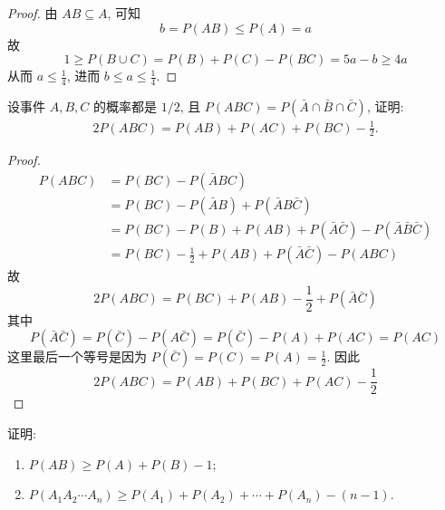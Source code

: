 \documentclass[../main.tex]{subfiles}
\begin{document}
\begin{proof}
    由 \(  AB \subseteq A  \), 可知 \[
    b= P\left( AB \right)\le P\left( A \right)= a  
    \] 故
  \[
  1\ge P\left( B\cup C \right)= P\left( B \right)+ P\left( C \right)-P\left( BC \right)= 5a-b    \ge 4a
  \]从而 \(  a\le \frac{1 }{4 }   \), 进而 \(  b\le a\le \frac{1 }{4 }   \).  
\end{proof}
\begin{exercise}{}{}
设事件 $A, B, C$ 的概率都是 $1/2$, 且 $P(ABC) = P(\bar{A}\cap\bar{B}\cap\bar{C})$, 证明:
\[\begin{aligned}
2P(ABC) = P(AB) + P(AC) + P(BC) - \frac{1}{2}.
\end{aligned}\]
\end{exercise}

\begin{proof}
     \[
     \begin{aligned}
     P\left( ABC \right)&= P\left( BC \right)-P\left( \bar{A}BC \right)\\ 
      &=     P\left( BC \right)-P\left( \bar{A}B \right)+ P\left( \bar{A}B \bar{C} \right)   \\ 
       &= P\left( BC \right)-P\left( B \right)+ P\left( AB \right)     + P\left( \bar{A}\bar{C} \right)-P\left( \bar{A}\bar{B}\bar{C} \right)  \\ 
        &= P\left( BC \right)-\frac{1 }{2 }+ P\left( AB \right)+ P\left( \bar{A}\bar{C} \right) -P\left( ABC \right)     
     \end{aligned}
     \]故 \[
     2P\left( ABC \right)= P\left( BC \right)+ P\left( AB \right)-\frac{1 }{2 }+ P\left( \bar{A}\bar{C} \right)     
     \]其中 \[
     P\left( \bar{A}\bar{C} \right)= P\left( \bar{C} \right)-P\left( A \bar{C} \right)= P\left( \bar{C} \right)-P\left( A \right)+ P\left( AC \right)    = P\left( AC \right) 
     \]这里最后一个等号是因为 \(  P\left( \bar{C} \right)= P\left( C \right)= P\left( A \right)= \frac{1 }{2 }      \). 因此 \[
     2P\left( ABC \right)= P\left( AB \right)+ P\left( BC \right)+ P\left( AC \right)-\frac{1 }{2 }     
     \]
\end{proof}
\begin{exercise}{}{}
证明:
\begin{enumerate}
    \item $P(AB) \ge P(A) + P(B) - 1$;
    \item $P(A_1 A_2 \cdots A_n) \ge P(A_1) + P(A_2) + \cdots + P(A_n) - (n-1)$.
\end{enumerate}
\end{exercise}
\end{document}
